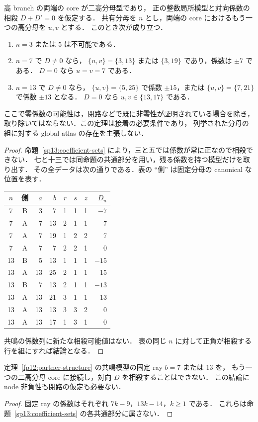 \begin{theorem}[小分母の二価接続に必要な隣接分母]
\label{sp13:propagation}
高 branch の両端の core が二高分母型であり，
正の整数局所模型と対向係数の相殺 $D+D'=0$ を仮定する．
共有分母を $n$ とし，両端の core におけるもう一つの高分母を $u,v$ とする．
このとき次が成り立つ．
\begin{enumerate}
\item $n=3$ または $5$ は不可能である．
\item $n=7$ で $D\ne0$ なら，
      $\{u,v\}=\{3,13\}$ または $\{3,19\}$ であり，係数は $\pm7$ である．
      $D=0$ なら $u=v=7$ である．
\item $n=13$ で $D\ne0$ なら，
      $\{u,v\}=\{5,25\}$ で係数 $\pm15$，または
      $\{u,v\}=\{7,21\}$ で係数 $\pm13$ となる．
      $D=0$ なら $u,v\in\{13,17\}$ である．
\end{enumerate}
ここで零係数の可能性は，閉路などで既に非零性が証明されている場合を除き，
取り除いてはならない．この定理は接着の必要条件であり，
列挙された分母の組に対する global atlas の存在を主張しない．
\end{theorem}

\begin{proof}
命題~\ref{sp13:coefficient-sets} により，三と五では係数が常に正なので相殺できない．
七と十三では同命題の共通部分を用い，残る係数を持つ模型だけを取り出す．
その全データは次の通りである．表の ``側'' は固定分母の canonical な位置を表す．
\begin{center}
\small
\begin{tabular}{ccrrrrrr}
 $n$ & 側 & $a$ & $b$ & $r$ & $s$ & $z$ & $D_n$\\\hline
 7&B&3&7&1&1&1&$-7$\\
 7&A&7&13&2&1&1&7\\
 7&A&7&19&1&2&2&7\\
 7&A&7&7&2&2&1&0\\\hline
 13&B&5&13&1&1&1&$-15$\\
 13&A&13&25&2&1&1&15\\
 13&B&7&13&2&1&1&$-13$\\
 13&A&13&21&3&1&1&13\\
 13&A&13&13&3&3&2&0\\
 13&A&13&17&1&3&1&0
\end{tabular}
\end{center}
共鳴の係数列に新たな相殺可能値はない．
表の同じ $n$ に対して正負が相殺する行を組にすれば結論となる．
\end{proof}

\begin{corollary}
\label{sp13:no-resonant-continuation}
定理~\ref{fp12:partner-structure} の共鳴模型の固定 ray $b=7$ または $13$ を，
もう一つの二高分母 core に接続し，対向 $D$ を相殺することはできない．
この結論に node 非負性も閉路の仮定も必要ない．
\end{corollary}

\begin{proof}
固定 ray の係数はそれぞれ $7k-9$，$13k-14$，$k\geq1$ である．
これらは命題~\ref{sp13:coefficient-sets} の各共通部分に属さない．
\end{proof}

